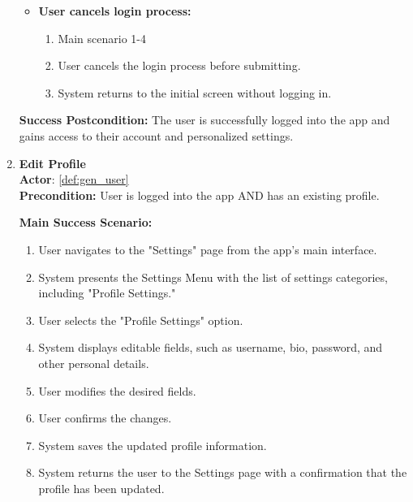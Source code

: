 \documentclass{article}
\begin{document}
\begin{enumerate}[label=\textbf{UC\arabic*}]
\begin{itemize}
              \item[{}] \textbf{User cancels login process:}
                    \begin{enumerate}[label=\textbf{\arabic*.}]
                        \item Main scenario 1-4
                        \item User cancels the login process before submitting.
                        \item System returns to the initial screen without logging in.
                    \end{enumerate}
          \end{itemize}

          \textbf{Success Postcondition:} The user is successfully logged into the app and gains access to their account and personalized settings.

    \item \label{uc:25} \textbf{Edit Profile} \\
          \textbf{Actor}: \ref{def:gen_user} \\
          \textbf{Precondition:} User is logged into the app AND has an existing profile.

          \textbf{Main Success Scenario:}
          \begin{enumerate}[label=\textbf{\arabic*.}]
              \item User navigates to the "Settings" page from the app’s main interface.
              \item System presents the Settings Menu with the list of settings categories, including "Profile Settings."
              \item User selects the "Profile Settings" option.
              \item System displays editable fields, such as username, bio, password, and other personal details.
              \item User modifies the desired fields.
              \item User confirms the changes.
              \item System saves the updated profile information.
              \item System returns the user to the Settings page with a confirmation that the profile has been updated.
          \end{enumerate}


\end{enumerate}
\end{document}
